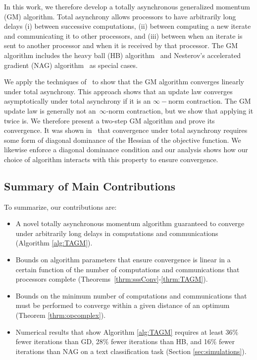 \documentclass[9pt,shortpaper,twoside,web]{ieeecolor}
\begin{document}
In this work, we therefore develop a totally asynchronous generalized momentum (GM) algorithm. 
Total asynchrony allows processors to have arbitrarily long delays 
(i) between successive computations, 
(ii) between computing a new iterate and communicating it to other processors,
and 
(iii) between when an iterate is sent
to another processor and when it is received by that processor. 
The GM algorithm
includes the heavy ball (HB) algorithm~\cite{polyak1964some} and Nesterov's accelerated
gradient (NAG) algorithm~\cite{nesterov1983method} as special cases. 

We apply the techniques of~\cite[Chapter 6]{bertsekas1989parallel} to show that 
the GM algorithm converges linearly under total asynchrony.
This approach shows that an update law converges asymptotically under
total asynchrony if it is an $\infty-$norm 
contraction. The GM update law is generally not
an~$\infty$-norm contraction, but 
we show that applying it
twice is. 
We therefore present a two-step GM algorithm and prove
its convergence. It was shown in~\cite{bertsekas1989parallel} that
convergence under total asynchrony requires some form
of diagonal dominance of the Hessian of the objective function.
We likewise enforce a diagonal dominance condition
and our analysis shows how our choice of algorithm
interacts with this property to ensure convergence. 

\subsection{Summary of Main Contributions}
To summarize, our contributions are:
\begin{itemize}
    \item A novel totally asynchronous momentum algorithm guaranteed to converge under arbitrarily long delays in computations and communications (Algorithm \ref{alg:TAGM}).
    \item Bounds on algorithm parameters that ensure convergence is linear in a certain function of the number of 
    computations and communications that processors complete (Theorems~\ref{thrm:sssConv}-\ref{thrm:TAGM}).
    \item Bounds on the minimum number of computations and communications 
    that must be performed to converge within a given distance of an optimum (Theorem \ref{thrm:opcomplex}).
    \item Numerical results that show Algorithm \ref{alg:TAGM} requires at least 36$\%$ fewer iterations than GD, 28$\%$ fewer iterations than HB, and 16$\%$ fewer iterations than NAG on a text classification task (Section \ref{sec:simulations}).
\end{itemize}
\end{document}
